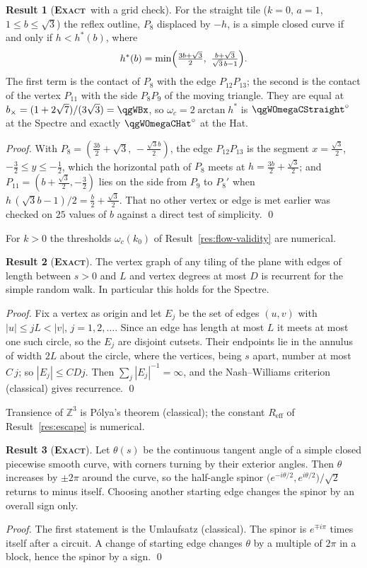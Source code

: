 \documentclass[11pt]{article}
\newcommand{\exact}{\textbf{\textsc{Exact}}}
\theoremstyle{definition}
\newtheorem{result}{Result}
\begin{document}
\begin{result}[\exact\ with a grid check]\label{res:found-valid}
For the straight tile ($k=0$, $a=1$, $1\le b\le\sqrt3$) the reflex outline, $P_8$ displaced by $-h$, is a simple closed curve if and only if $h<h^*(b)$, where
\[
h^*(b)=\min\Bigl(\tfrac{3b+\sqrt3}{2},\ \tfrac{b+\sqrt3}{\sqrt3\,b-1}\Bigr).
\]
The first term is the contact of $P_8$ with the edge $P_{12}P_{13}$; the second is the contact of the vertex $P_{11}$ with the side $P_8P_9$ of the moving triangle. They are equal at $b_\times=(1+2\sqrt7)/(3\sqrt3)=\qgWBx$, so $\omega_c=2\arctan h^*$ is $\qgWOmegaCStraight^\circ$ at the Spectre and exactly $\qgWOmegaCHat^\circ$ at the Hat.
\end{result}
\emph{Proof.} With $P_8=(\tfrac{3b}{2}+\sqrt3,\,-\tfrac{\sqrt3b}{2})$, the edge $P_{12}P_{13}$ is the segment $x=\tfrac{\sqrt3}2$, $-\tfrac32\le y\le-\tfrac12$, which the horizontal path of $P_8$ meets at $h=\tfrac{3b}2+\tfrac{\sqrt3}2$; and $P_{11}=(b+\tfrac{\sqrt3}2,-\tfrac32)$ lies on the side from $P_9$ to $P_8'$ when $h\,(\sqrt3b-1)/2=\tfrac b2+\tfrac{\sqrt3}2$. That no other vertex or edge is met earlier was checked on $25$ values of $b$ against a direct test of simplicity. \qed

For $k>0$ the thresholds $\omega_c(k_0)$ of Result~\ref{res:flow-validity} are numerical.
\begin{result}[\exact]\label{res:found-recur}
The vertex graph of any tiling of the plane with edges of length between $s>0$ and $L$ and vertex degrees at most $D$ is recurrent for the simple random walk. In particular this holds for the Spectre.
\end{result}
\emph{Proof.} Fix a vertex as origin and let $E_j$ be the set of edges $(u,v)$ with $|u|\le jL<|v|$, $j=1,2,\dots$. Since an edge has length at most $L$ it meets at most one such circle, so the $E_j$ are disjoint cutsets. Their endpoints lie in the annulus of width $2L$ about the circle, where the vertices, being $s$ apart, number at most $C\,j$; so $|E_j|\le CDj$. Then $\sum_j|E_j|^{-1}=\infty$, and the Nash--Williams criterion (classical) gives recurrence. \qed

Transience of $\mathbb{Z}^3$ is P\'olya's theorem (classical); the constant $R_{\mathrm{eff}}$ of Result~\ref{res:escape} is numerical.
\begin{result}[\exact]\label{res:found-spin}
Let $\theta(s)$ be the continuous tangent angle of a simple closed piecewise smooth curve, with corners turning by their exterior angles. Then $\theta$ increases by $\pm2\pi$ around the curve, so the half-angle spinor $\bigl(e^{-i\theta/2},e^{i\theta/2}\bigr)/\sqrt2$ returns to minus itself. Choosing another starting edge changes the spinor by an overall sign only.
\end{result}
\emph{Proof.} The first statement is the Umlaufsatz (classical). The spinor is $e^{\mp i\pi}$ times itself after a circuit. A change of starting edge changes $\theta$ by a multiple of $2\pi$ in a block, hence the spinor by a sign. \qed
\end{document}
